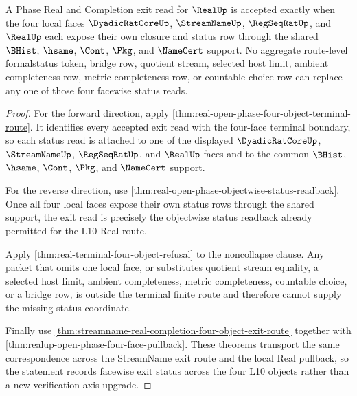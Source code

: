 \begin{theorem}
\label{thm:real-l10-facewise-exit-status-noncollapse}
A Phase Real and Completion exit read for $\RealUp$ is accepted exactly when the four local faces $\DyadicRatCoreUp$, $\StreamNameUp$, $\RegSeqRatUp$, and $\RealUp$ each expose their own closure and status row through the shared $\BHist$, $\hsame$, $\Cont$, $\Pkg$, and $\NameCert$ support. No aggregate route-level formalstatus token, bridge row, quotient stream, selected host limit, ambient completeness row, metric-completeness row, or countable-choice row can replace any one of those four facewise status reads.
\end{theorem}
\begin{proof}
For the forward direction, apply \autoref{thm:real-open-phase-four-object-terminal-route}. It identifies every accepted exit read with the four-face terminal boundary, so each status read is attached to one of the displayed $\DyadicRatCoreUp$, $\StreamNameUp$, $\RegSeqRatUp$, and $\RealUp$ faces and to the common $\BHist$, $\hsame$, $\Cont$, $\Pkg$, and $\NameCert$ support.

For the reverse direction, use \autoref{thm:real-open-phase-objectwise-status-readback}. Once all four local faces expose their own status rows through the shared support, the exit read is precisely the objectwise status readback already permitted for the L10 Real route.

Apply \autoref{thm:real-terminal-four-object-refusal} to the noncollapse clause. Any packet that omits one local face, or substitutes quotient stream equality, a selected host limit, ambient completeness, metric completeness, countable choice, or a bridge row, is outside the terminal finite route and therefore cannot supply the missing status coordinate.

Finally use \autoref{thm:streamname-real-completion-four-object-exit-route} together with \autoref{thm:realup-open-phase-four-face-pullback}. These theorems transport the same correspondence across the StreamName exit route and the local Real pullback, so the statement records facewise exit status across the four L10 objects rather than a new verification-axis upgrade.
\end{proof}
